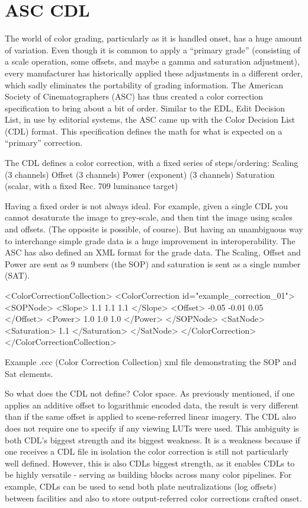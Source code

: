 \section{ASC CDL}
\label{sec:asc-cdl}

The world of color grading, particularly as it is handled onset, has a huge amount of variation. Even though it is common to apply a “primary grade” (consisting of a scale operation, some offsets, and maybe a gamma and saturation adjustment), every manufacturer has historically applied these adjustments in a different order, which sadly eliminates the portability of grading information. The American Society of Cinematographers (ASC) has thus created a color correction specification to bring about a bit of order. Similar to the EDL, Edit Decision List, in use by editorial systems, the ASC came up with the Color Decision List (CDL) format. This specification defines the math for what is expected on a “primary” correction.

The CDL defines a color correction, with a fixed series of steps/ordering:
 Scaling (3 channels)
 Offset (3 channels)
 Power (exponent) (3 channels)
 Saturation (scalar, with a fixed Rec. 709 luminance target)

Having a fixed order is not always ideal. For example, given a single CDL you cannot desaturate the image to grey-scale, and then tint the image using scales and offsets. (The opposite is possible, of course). But having an unambiguous way to interchange simple grade data is a huge improvement in interoperability. The ASC has also defined an XML format for the grade data. The Scaling, Offset and Power are sent as 9 numbers (the SOP) and saturation is sent as a single number (SAT).

	<ColorCorrectionCollection>
	<ColorCorrection id="example_correction_01">
			<SOPNode>
		<Slope> 1.1 1.1 1.1 </Slope>
		<Offset> -0.05 -0.01 0.05 </Offset>
		<Power> 1.0 1.0 1.0 </Power>
	</SOPNode>
	<SatNode>
		<Saturation> 1.1 </Saturation>
	</SatNode>
</ColorCorrection>
	</ColorCorrectionCollection>

Example .ccc (Color Correction Collection) xml file demonstrating the SOP and Sat elements.

So what does the CDL not define? Color space. As previously mentioned, if one applies an additive offset to logarithmic encoded data, the result is very different than if the same offset is applied to scene-referred linear imagery. The CDL also does not require one to specify if any viewing LUTs were used. This ambiguity is both CDL’s biggest strength and its biggest weakness. It is a weakness because if one receives a CDL file in isolation the color correction is still not particularly well defined. However, this is also CDLs biggest strength, as it enables CDLs to be highly versatile - serving as building blocks across many color pipelines. For example, CDLs can be used to send both plate neutralizations (log offsets) between facilities and also to store output-referred color corrections crafted onset.

